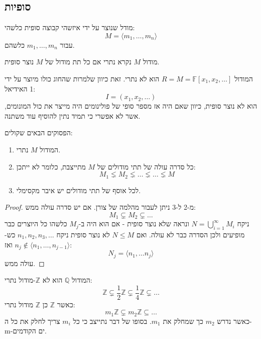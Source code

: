 \documentclass{tstextbook}
\begin{document}
\subsection{סופיות}

\begin{definition}
מודל שנוצר על ידי איזשהי קבוצה סופית כלשהי:
$$M=\langle m_{1},\dots,m_{n} \rangle $$
עבור \(m_{1},\dots ,m_{n}\) כלשהם.

\end{definition}
\begin{definition}
מודול \(M\) נקרא נתרי אם כל תת מודול של \(M\) נוצר סופית.

\end{definition}
\begin{example}
המודול \(R=M=\mathbb{F}[x_{1},x_{2},\dots]\) הוא לא נתרי. זאת כיוון שלמרות שהחוג כולו מיוצר על ידי 1 האידיאל:
$$I=(x_{1},x_{2},\dots)$$
הוא לא נוצר סופית, כיוון שאם היה אז מספר סופי של פולינומים היה מייצר את כול המונומים, אשר לא אפשרי כי תמיד נתין להוסיף עוד משתנה.

\end{example}
\begin{proposition}
הפסוקים הבאים שקולים:

  \begin{enumerate}
    \item המודול \(M\) נתרי. 


    \item כל סדרה עולה של תתי מודולים של \(M\) מתייצבת, כלומר לא ייתכן: 
$$M_{1} \lneq M_{2}\lneq \dots \lneq \dots \lneq M$$


    \item לכל אוסף של תתי מודולים יש איבר מקסימלי. 


  \end{enumerate}
\end{proposition}
\begin{proof}
מ-2 ל-3 ניתן לעבור מהלמה של צורן.
אם יש סדרה עולה ממש:
$$M_{1} \subsetneq M_{2} \subsetneq \dots$$
ניקח \(N=\bigcup_{i=1}^{\infty}M_{i}\) ונראה שלא נוצר סופית - אם הוא היה ב-\(M_{j}\) כלשהו כל היוצרים כבר מופיעים ולכן הסדרה כבר לא עולה. ואם \(N\leq M\) לא נוצר סופית ניקח \(n_{1},n_{2},n_{3},\dots\) כש-\(n_{j}\not\in \langle n_{1},\dots,n_{j-1} \rangle\) ואז:
$$N_{j}=\langle n_{1},\dots n_{j} \rangle $$
עולה ממש.

\end{proof}
\begin{example}
המודול \(\mathbb{Q}\) הוא לא \(\mathbb{Z}\)-מודול נתרי:
$$\mathbb{Z}\subsetneq \frac{1}{2}\mathbb{Z} \subsetneq \frac{1}{4}\mathbb{Z} \subsetneq \dots$$
כאשר \(\mathbb{Z}\) כן \(\mathbb{Z}\) מודול נתרי:
$$m_{1}\mathbb{Z} \subsetneq m_{2}\mathbb{Z} \subseteq \dots $$
כאשר נדרש \(m_{2}\) כך שמחלק את \(m_{1}\). בסופו של דבר נתייצב כי כל \(m_{i}\) צריך לחלק את כל ה-m-ים הקודמים.

\end{example}
\end{document}
